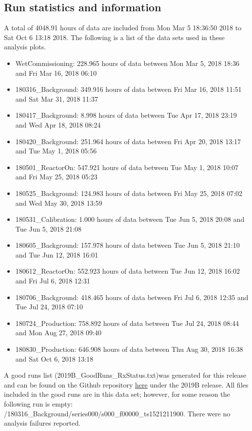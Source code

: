 \subsection{Run statistics and information}
A total of 4048.91 hours of data are included from Mon Mar  5 18:36:50 2018 to Sat Oct  6 13:18 2018. The following is a list of the data sets used in these analysis plots. 
\begin{itemize}
\item{WetCommissioning: 228.965 hours of data between Mon Mar 5, 2018 18:36 and Fri Mar 16, 2018 06:10}
\item{180316\_Background: 349.916 hours of data between Fri Mar 16, 2018 11:51 and Sat Mar 31, 2018 11:37}
\item{180417\_Background: 8.998 hours of data between Tue Apr 17, 2018 23:19 and Wed Apr 18, 2018 08:24}
\item{180420\_Background: 251.964 hours of data between Fri Apr 20, 2018 13:17 and Tue May 1, 2018 05:56}
\item{180501\_ReactorOn: 547.921 hours of data between Tue May 1, 2018 10:07 and Fri May 25, 2018 05:23}
\item{180525\_Background: 124.983 hours of data between Fri May 25, 2018 07:02 and Wed May 30, 2018 13:59}
\item{180531\_Calibration: 1.000 hours of data between Tue Jun 5, 2018 20:08 and Tue Jun 5, 2018 21:08}
\item{180605\_Background: 157.978 hours of data between Tue Jun 5, 2018 21:10 and Tue Jun 12, 2018 16:01}
\item{180612\_ReactorOn: 552.923 hours of data between Tue Jun 12, 2018 16:02 and Fri Jul 6, 2018 12:31}
\item{180706\_Background: 418.465 hours of data between Fri Jul 6, 2018 12:35 and Tue Jul 24, 2018 07:10}
\item{180724\_Production: 758.892 hours of data between Tue Jul 24, 2018 08:44 and Mon Aug 27, 2018 09:40}
\item{180830\_Production: 646.908 hours of data between Thu Aug 30, 2018 16:38 and Sat Oct 6, 2018 13:18}
\end{itemize}
A good runs list (2019B\_GoodRuns\_RxStatus.txt)was generated for this release and can be found on the Github repository  \href{https://github.com/PROSPECT-collaboration/PROSPECT2x_Analysis/tree/master/Analysis/AnalyzerConfig/2019B\_GoodRuns\_RxStatus.txt}{here} under the 2019B release. All files included in the good runs are in this data set; however, for some reason the following run is empty: /180316\_Background/series000/s000\_f00000\_ts1521211900. There were no analysis failures reported.
